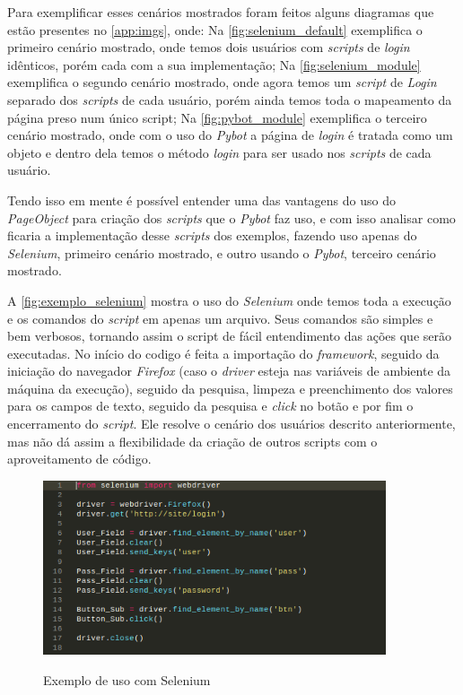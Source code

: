     Para exemplificar esses cenários mostrados foram feitos alguns diagramas que estão presentes no \autoref{app:imgs}, onde:
    Na \autoref{fig:selenium_default} exemplifica o primeiro cenário mostrado, onde temos dois usuários com \textit{scripts} de \textit{login}
    idênticos, porém cada com a sua implementação;
    Na \autoref{fig:selenium_module} exemplifica o segundo cenário mostrado, onde agora temos um \textit{script} de \textit{Login}
    separado dos \textit{scripts} de cada usuário, porém ainda temos toda o mapeamento da página preso num único script;
    Na \autoref{fig:pybot_module} exemplifica o terceiro cenário mostrado, onde com o uso do \textit{Pybot} a página de \textit{login}
    é tratada como um objeto e dentro dela temos o método \textit{login} para ser usado nos \textit{scripts} de cada usuário.


    Tendo isso em mente é possível entender uma das vantagens do uso do \textit{PageObject} para criação dos \textit{scripts} que
    o \textit{Pybot} faz uso, e com isso analisar como ficaria a implementação desse \textit{scripts} dos exemplos, fazendo uso apenas
    do \textit{Selenium}, primeiro cenário mostrado, e outro usando o \textit{Pybot}, terceiro cenário mostrado.

    A \autoref{fig:exemplo_selenium} mostra o uso do \textit{Selenium} onde temos toda a execução e os comandos do \textit{script} em
    apenas um arquivo. Seus comandos são simples e bem verbosos, tornando assim o script de fácil entendimento das ações que serão executadas.
    No início do codigo é feita a importação do \textit{framework}, seguido da iniciação do navegador \textit{Firefox} (caso o \textit{driver} esteja nas
    variáveis de ambiente da máquina da execução), seguido da pesquisa, limpeza e preenchimento dos valores para os campos de texto, seguido da pesquisa
    e \textit{click} no botão e por fim o encerramento do \textit{script}. Ele resolve o cenário dos usuários descrito anteriormente, mas não dá assim a
    flexibilidade da criação de outros scripts com o aproveitamento de código.


    \begin{figure}[H]
        \vspace*{0,5cm}
        \centering
        \caption{Exemplo de uso com Selenium}
        \includegraphics[width=0.9\textwidth]{./04-figuras/exemplo_selenium}
        \label{fig:exemplo_selenium}
        \vspace*{0,5cm}
    \end{figure}

